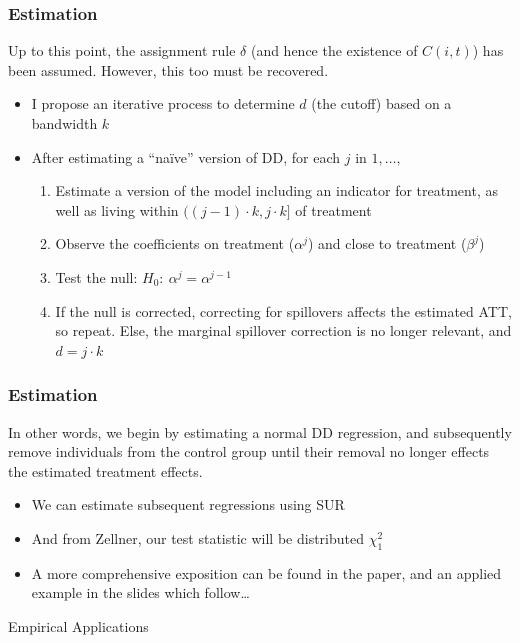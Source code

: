 \documentclass[10pt,letterpaper,subeqn]{beamer}
\begin{document}
\begin{frame}[label=estim9]
  \frametitle{Estimation}
Up to this point, the assignment rule $\delta$ (and hence the existence of 
$C(i,t)$) has been assumed.  However, this too must be recovered.
\vspace{5mm}
\begin{itemize}
\item I propose an iterative process to determine $d$ (the cutoff) based on a
bandwidth $k$
\item After estimating a ``na\"ive'' version of DD, for each $j$ in $1,\ldots,$
\vspace{2mm}
\begin{enumerate}
\item Estimate a version of the model including an indicator for treatment,
as well as living within $((j-1)\cdot k, j\cdot k]$ of treatment
\item Observe the coefficients on treatment ($\alpha^j$) and close to treatment
($\beta^j$)
\item Test the null: $H_0:\ \alpha^j=\alpha^{j-1}$
\item If the null is corrected, correcting for spillovers affects the estimated
ATT, so repeat.  Else, the marginal spillover correction is no longer relevant,
and $d=j\cdot k$
\end{enumerate}
\end{itemize}
\end{frame}

\begin{frame}[label=estim10]
  \frametitle{Estimation}
In other words, we begin by estimating a normal DD regression, and subsequently
remove individuals from the control group until their removal no longer effects
the estimated treatment effects.
\vspace{6mm}
\begin{itemize}
\item We can estimate subsequent regressions using SUR
\item And from Zellner, our test statistic will be distributed $\chi^2_1$
\item A more comprehensive exposition can be found in the paper, and an applied
example in the slides which follow\ldots
\end{itemize}  
\end{frame}
\begin{frame}
\begin{center}
\Large Empirical Applications
\end{center}
\end{frame}
\end{document}
